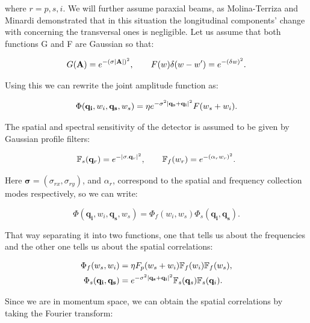 \documentclass[12pt]{book}
\begin{document}
where $r=p,s,i$. We will further assume paraxial beams,  as Molina-Terriza and Minardi \cite{minardi} demonstrated that in this situation the longitudinal components' change with concerning the transversal ones is negligible. Let us assume that both functions G and F are Gaussian so that:

\begin{equation}
G(\mathbf{A})=e^{- (\sigma \abs{\mathbf{A}})^{2} },\qquad F(w)\delta(w-w')=e^{-(\delta w)^2}.
\end{equation}

Using this we can rewrite the joint amplitude function as:

\begin{equation}
\Phi(\mathbf{q_{i}},w_{i},\mathbf{q_{s}},w_{s})= \eta e^{-\sigma^{2}\abs{\mathbf{q_{s}}+\mathbf{q_{i}}}^{2}} F(w_{s}+w_{i}).
\end{equation}

The spatial and spectral sensitivity of the detector is assumed to be given by Gaussian profile filters:

\begin{equation}
\mathbb{F}_{s}(\mathbf{q}_{r})=e^{-\abs{\mathbf{\sigma}.\mathbf{q}_{r}}^{2}},\qquad \mathbb{F}_{f}(w_{r})=e^{-(\alpha_{r} w_{r})^{2}}.
\end{equation}

Here $\mathbf{\sigma}=(\sigma_{rx},\sigma_{ry})$, and $\alpha_{r}$, correspond to the spatial and frequency collection modes respectively, so we can write:
 
\begin{equation}
\Phi(\mathbf{q_{i}},w_{i},\mathbf{q_{s}},w_{s})=\Phi_{f}(w_{i},w_{s})\Phi_{s}(\mathbf{q_{i}},\mathbf{q_{s}}).
\end{equation}

That way separating it into two functions, one that tells us about the frequencies  and the other one tells us about the spatial correlations:

\begin{align}
\Phi_{f}(w_{s},w_{i})&= \eta F_{p}(w_{s}+w_{i}) \mathbb{F}_{f}(w_{i})\mathbb{F}_{f}(w_{s}),\\
\Phi_{s}(\mathbf{q_{i}},\mathbf{q_{s}})&=e^{-\sigma^{2}\abs{\mathbf{q_{s}}+\mathbf{q_{i}}}^{2}}\mathbb{F}_{s}(\mathbf{q}_{s})\mathbb{F}_{s}(\mathbf{q}_{i}).
\end{align}

Since we are in momentum space, we can obtain the spatial correlations by taking the Fourier transform:
\end{document}
